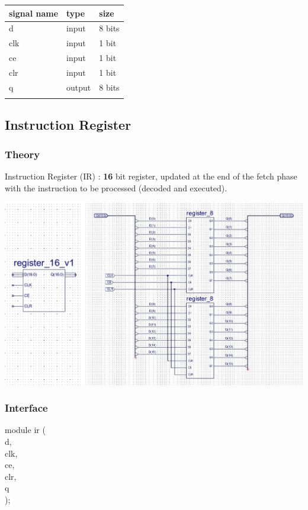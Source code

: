 \documentclass[11pt]{article}
\begin{document}
\begin{center}
\begin{tabular}{lll}
signal name & type & size\\
\hline
d & input & 8 bits\\
clk & input & 1 bit\\
ce & input & 1 bit\\
clr & input & 1 bit\\
q & output & 8 bits\\
 &  & \\
\hline
\end{tabular}
\end{center}
\subsection{Instruction Register}
\label{sec:org6eebe5e}
\subsubsection{Theory}
\label{sec:orga413288}
Instruction Register (IR) : \textbf{16} bit register, updated at the end of the fetch phase with the instruction to be processed (decoded and executed).
\begin{center}
\includegraphics[width=.9\linewidth]{./images/reg16.jpg}
\end{center}
\subsubsection{Interface}
\label{sec:org5a0166f}
module ir (\\
    d,\\
    clk,\\
    ce,\\
    clr,\\
    q\\
    );\\
\end{document}
